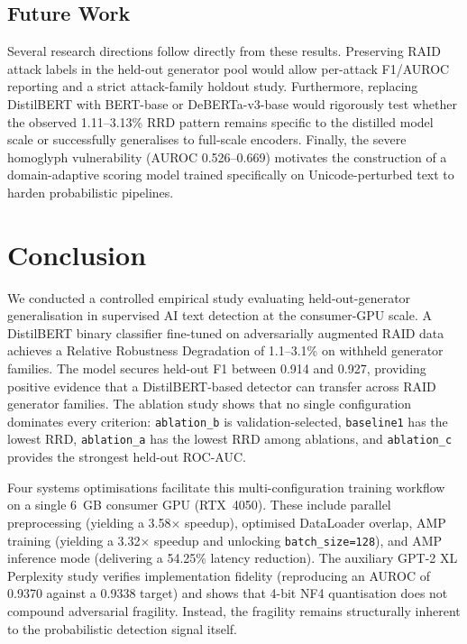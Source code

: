 \documentclass[conference]{IEEEtran}
\begin{document}
\subsection{Future Work}\label{ssec:future}

Several research directions follow directly from these results. Preserving RAID
attack labels in the held-out generator pool would allow per-attack F1/AUROC
reporting and a strict attack-family holdout study. Furthermore, replacing
DistilBERT with BERT-base or DeBERTa-v3-base would rigorously test whether the
observed 1.11--3.13\% RRD pattern remains specific to the distilled model scale
or successfully generalises to full-scale encoders. Finally, the severe
homoglyph vulnerability (AUROC
0.526--0.669) motivates the construction of a domain-adaptive scoring model
trained specifically on Unicode-perturbed text to harden probabilistic pipelines.

\section{Conclusion}\label{sec:conclusion}

We conducted a controlled empirical study evaluating held-out-generator
generalisation in supervised AI text detection at the consumer-GPU scale. A
DistilBERT binary classifier fine-tuned on adversarially augmented RAID data
achieves a Relative Robustness Degradation of 1.1--3.1\% on withheld generator
families. The model secures held-out F1 between 0.914 and 0.927, providing
positive evidence that a DistilBERT-based detector can transfer across RAID
generator families. The ablation study shows that no single
configuration dominates every criterion: \texttt{ablation\_b} is
validation-selected, \texttt{baseline1} has the lowest RRD,
\texttt{ablation\_a} has the lowest RRD among ablations, and
\texttt{ablation\_c} provides the strongest held-out ROC-AUC.

Four systems optimisations facilitate this multi-configuration training workflow on
a single 6~GB consumer GPU (RTX~4050). These include parallel preprocessing (yielding a
3.58$\times$ speedup), optimised DataLoader overlap, AMP training (yielding a
3.32$\times$ speedup and unlocking \texttt{batch\_size=128}), and AMP inference
mode (delivering a 54.25\% latency reduction). The auxiliary GPT-2 XL Perplexity
study verifies implementation fidelity (reproducing an AUROC of 0.9370 against a
0.9338 target) and shows that 4-bit NF4 quantisation does not compound
adversarial fragility. Instead, the fragility remains structurally inherent to
the probabilistic detection signal itself.
\end{document}
